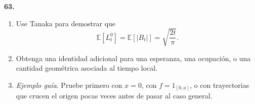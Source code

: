\documentclass[11pt, letterpaper]{article}
\begin{document}
\newpage

\begin{ejercicio}
    \textbf{63.} 
    \begin{enumerate}
        \item Use Tanaka para demostrar que
        \[ \mathbb{E}[L_{t}^{0}]=\mathbb{E}[|B_{t}|]=\sqrt{\frac{2t}{\pi}}. \]
        \item Obtenga una identidad adicional para una esperanza, una ocupación, o una cantidad geométrica asociada al tiempo local.
        \item \textit{Ejemplo guía}. Pruebe primero con $x=0$, con $f=1_{[0,a]}$, o con trayectorias que crucen el origen pocas veces antes de pasar al caso general.
    \end{enumerate}
\end{ejercicio}

\vspace{5mm}
\end{document}
